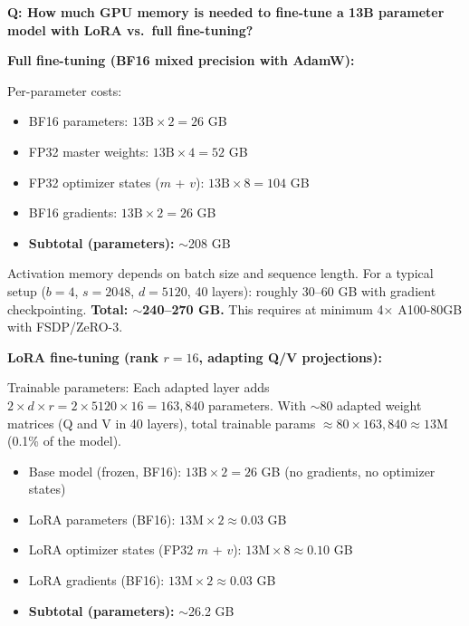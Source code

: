 \begin{interviewq}
\end{interviewq}

\begin{interviewq}
\textbf{Q: How much GPU memory is needed to fine-tune a 13B parameter model with LoRA vs.\ full fine-tuning?}

 \quad {} \quad \badgefreq{\freqhigh}

\stronganswer

\textbf{Full fine-tuning (BF16 mixed precision with AdamW):}

Per-parameter costs:
\begin{itemize}
    \item BF16 parameters: $13\text{B} \times 2 = 26$ GB
    \item FP32 master weights: $13\text{B} \times 4 = 52$ GB
    \item FP32 optimizer states ($m$ + $v$): $13\text{B} \times 8 = 104$ GB
    \item BF16 gradients: $13\text{B} \times 2 = 26$ GB
    \item \textbf{Subtotal (parameters):} $\sim$208 GB
\end{itemize}

Activation memory depends on batch size and sequence length. For a typical setup ($b=4$, $s=2048$, $d=5120$, 40 layers): roughly 30--60 GB with gradient checkpointing. \textbf{Total: $\sim$240--270 GB.} This requires at minimum 4$\times$ A100-80GB with FSDP/ZeRO-3.

\textbf{LoRA fine-tuning (rank $r = 16$, adapting Q/V projections):}

Trainable parameters: Each adapted layer adds $2 \times d \times r = 2 \times 5120 \times 16 = 163{,}840$ parameters. With $\sim$80 adapted weight matrices (Q and V in 40 layers), total trainable params $\approx 80 \times 163{,}840 \approx 13\text{M}$ (0.1\% of the model).
\begin{itemize}
    \item Base model (frozen, BF16): $13\text{B} \times 2 = 26$ GB (no gradients, no optimizer states)
    \item LoRA parameters (BF16): $13\text{M} \times 2 \approx 0.03$ GB
    \item LoRA optimizer states (FP32 $m$ + $v$): $13\text{M} \times 8 \approx 0.10$ GB
    \item LoRA gradients (BF16): $13\text{M} \times 2 \approx 0.03$ GB
    \item \textbf{Subtotal (parameters):} $\sim$26.2 GB
\end{itemize}


\end{interviewq}
